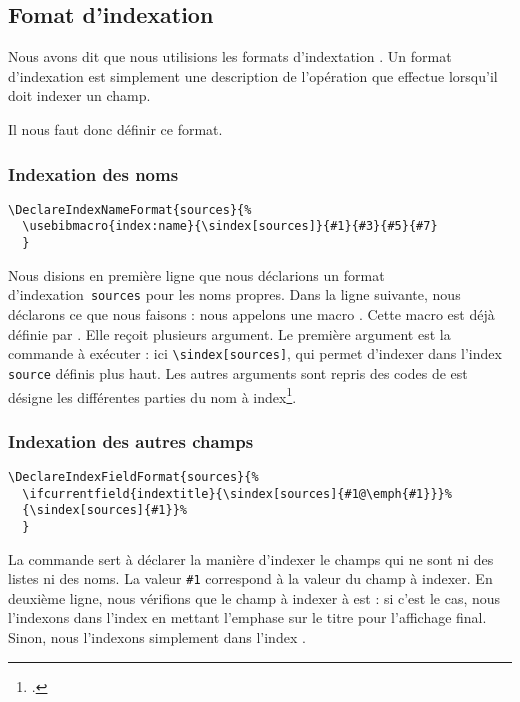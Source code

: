 \subsection{Fomat d'indexation }

Nous avons dit que nous utilisions les formats d'indextation . Un format d'indexation   est simplement une description de l'opération que  effectue lorsqu'il doit indexer un champ. 

Il nous faut donc définir ce format. 

\subsubsection{Indexation des noms}

\begin{verbatim}
\DeclareIndexNameFormat{sources}{%
  \usebibmacro{index:name}{\sindex[sources]}{#1}{#3}{#5}{#7}
  }
\end{verbatim}

Nous disions en première ligne que nous déclarions un format d'indexation \verb|sources| pour les noms propres. Dans la ligne suivante, nous déclarons ce que nous faisons : nous appelons une macro . Cette macro est déjà définie par . Elle reçoit plusieurs argument. Le première argument est la commande à exécuter : ici \verb|\sindex[sources]|, qui permet d'indexer dans l'index \verb|source| définis plus haut. Les autres arguments sont repris des codes de  est désigne les différentes parties du nom à index\footcite[Nous renvoyons le lecteur à la documentation de  : ][]{biblelatex_formats}.


\subsubsection{Indexation des autres champs}

\begin{verbatim}
\DeclareIndexFieldFormat{sources}{%
  \ifcurrentfield{indextitle}{\sindex[sources]{#1@\emph{#1}}}%
  {\sindex[sources]{#1}}%
  }
\end{verbatim}

La commande  sert à déclarer la manière d'indexer le champs qui ne sont ni des listes ni des noms. La valeur \verb|#1| correspond à la valeur du champ à indexer. En deuxième ligne, nous vérifions que le champ à indexer à est  : si c'est le cas, nous l'indexons dans l'index  en mettant l'emphase sur le titre pour l'affichage final. Sinon, nous l'indexons simplement dans l'index .

